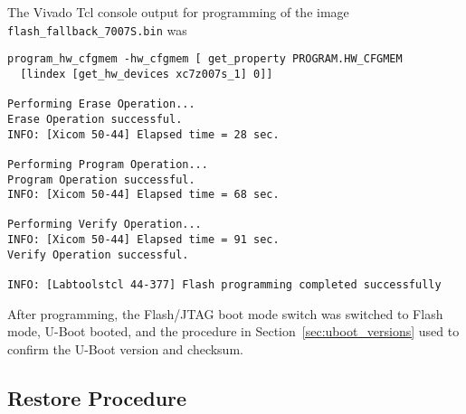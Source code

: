 The Vivado Tcl console output for programming of the image \verb+flash_fallback_7007S.bin+
was
%
\begin{verbatim}
program_hw_cfgmem -hw_cfgmem [ get_property PROGRAM.HW_CFGMEM
  [lindex [get_hw_devices xc7z007s_1] 0]]

Performing Erase Operation...
Erase Operation successful.
INFO: [Xicom 50-44] Elapsed time = 28 sec.

Performing Program Operation...
Program Operation successful.
INFO: [Xicom 50-44] Elapsed time = 68 sec.

Performing Verify Operation...
INFO: [Xicom 50-44] Elapsed time = 91 sec.
Verify Operation successful.

INFO: [Labtoolstcl 44-377] Flash programming completed successfully
\end{verbatim}
%
After programming, the Flash/JTAG boot mode switch was switched to Flash
mode, U-Boot booted, and the procedure in Section~\ref{sec:uboot_versions}
used to confirm the U-Boot version and checksum.

\clearpage
\subsection{Restore Procedure}
\label{sec:restore_procedure}

